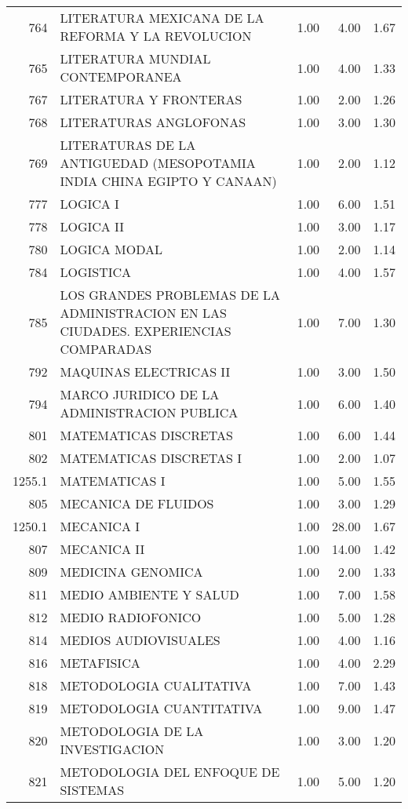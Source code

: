 \begin{table}[ht]
\begin{tabular}{rlrrr}
  764 & LITERATURA MEXICANA DE LA REFORMA Y LA REVOLUCION & 1.00 & 4.00 & 1.67 \\ 
  765 & LITERATURA MUNDIAL CONTEMPORANEA & 1.00 & 4.00 & 1.33 \\ 
  767 & LITERATURA Y FRONTERAS & 1.00 & 2.00 & 1.26 \\ 
  768 & LITERATURAS ANGLOFONAS & 1.00 & 3.00 & 1.30 \\ 
  769 & LITERATURAS DE LA ANTIGUEDAD (MESOPOTAMIA INDIA CHINA EGIPTO Y CANAAN) & 1.00 & 2.00 & 1.12 \\ 
  777 & LOGICA I & 1.00 & 6.00 & 1.51 \\ 
  778 & LOGICA II & 1.00 & 3.00 & 1.17 \\ 
  780 & LOGICA MODAL & 1.00 & 2.00 & 1.14 \\ 
  784 & LOGISTICA & 1.00 & 4.00 & 1.57 \\ 
  785 & LOS GRANDES PROBLEMAS DE LA ADMINISTRACION EN LAS CIUDADES. EXPERIENCIAS COMPARADAS & 1.00 & 7.00 & 1.30 \\ 
  792 & MAQUINAS ELECTRICAS II & 1.00 & 3.00 & 1.50 \\ 
  794 & MARCO JURIDICO DE LA ADMINISTRACION PUBLICA & 1.00 & 6.00 & 1.40 \\ 
  801 & MATEMATICAS DISCRETAS & 1.00 & 6.00 & 1.44 \\ 
  802 & MATEMATICAS DISCRETAS I & 1.00 & 2.00 & 1.07 \\ 
  1255.1 & MATEMATICAS I & 1.00 & 5.00 & 1.55 \\ 
  805 & MECANICA DE FLUIDOS & 1.00 & 3.00 & 1.29 \\ 
  1250.1 & MECANICA I & 1.00 & 28.00 & 1.67 \\ 
  807 & MECANICA II & 1.00 & 14.00 & 1.42 \\ 
  809 & MEDICINA GENOMICA & 1.00 & 2.00 & 1.33 \\ 
  811 & MEDIO AMBIENTE Y SALUD & 1.00 & 7.00 & 1.58 \\ 
  812 & MEDIO RADIOFONICO & 1.00 & 5.00 & 1.28 \\ 
  814 & MEDIOS AUDIOVISUALES & 1.00 & 4.00 & 1.16 \\ 
  816 & METAFISICA & 1.00 & 4.00 & 2.29 \\ 
  818 & METODOLOGIA CUALITATIVA & 1.00 & 7.00 & 1.43 \\ 
  819 & METODOLOGIA CUANTITATIVA & 1.00 & 9.00 & 1.47 \\ 
  820 & METODOLOGIA DE LA INVESTIGACION & 1.00 & 3.00 & 1.20 \\ 
  821 & METODOLOGIA DEL ENFOQUE DE SISTEMAS & 1.00 & 5.00 & 1.20 \\ 

\end{tabular}
\end{table}
